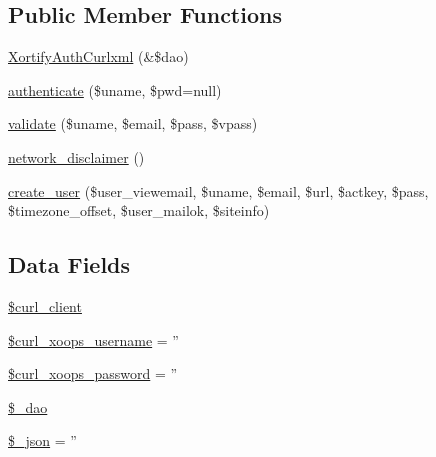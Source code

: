 \subsection*{Public Member Functions}
\begin{DoxyCompactItemize}
\item 
\hyperlink{class_xortify_auth_curlxml_a13dd1fcc61eefac807467f1ae7a9e2a6}{Xortify\-Auth\-Curlxml} (\&\$dao)
\item 
\hyperlink{class_xortify_auth_curlxml_a00678ba307326b734e6c679f28bea315}{authenticate} (\$uname, \$pwd=null)
\item 
\hyperlink{class_xortify_auth_curlxml_a91121a1b702dfd20fb65a027c8ed26ec}{validate} (\$uname, \$email, \$pass, \$vpass)
\item 
\hyperlink{class_xortify_auth_curlxml_a1874c27b6f81a3f2ff9015405ad0f8bc}{network\-\_\-disclaimer} ()
\item 
\hyperlink{class_xortify_auth_curlxml_ac72efc5ad313a592cf6706876f56f7ec}{create\-\_\-user} (\$user\-\_\-viewemail, \$uname, \$email, \$url, \$actkey, \$pass, \$timezone\-\_\-offset, \$user\-\_\-mailok, \$siteinfo)
\end{DoxyCompactItemize}
\subsection*{Data Fields}
\begin{DoxyCompactItemize}
\item 
\hyperlink{class_xortify_auth_curlxml_a402f2112991f3227835af80e9df33e38}{\$curl\-\_\-client}
\item 
\hyperlink{class_xortify_auth_curlxml_aab7480ba9f878a02b2c9fd43922fa070}{\$curl\-\_\-xoops\-\_\-username} = ''
\item 
\hyperlink{class_xortify_auth_curlxml_a6c9851541ed3826c67cfe7224c38f0b8}{\$curl\-\_\-xoops\-\_\-password} = ''
\item 
\hyperlink{class_xortify_auth_curlxml_a12a029c610f699b4b25e79a1f64a3485}{\$\-\_\-dao}
\item 
\hyperlink{class_xortify_auth_curlxml_a94787b37d92a2dee02534eed4f316589}{\$\-\_\-json} = ''
\end{DoxyCompactItemize}


